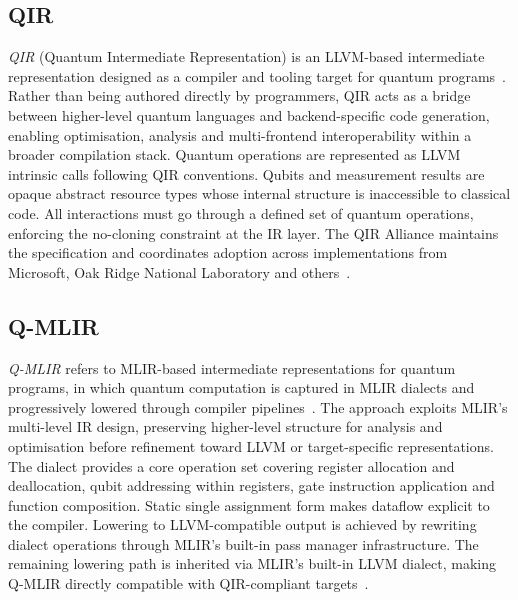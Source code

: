 \subsection{QIR}\label{subsec:pub_qpl_review:language_descriptions:qir}
\textit{QIR} (Quantum Intermediate Representation) is an LLVM-based intermediate representation designed as a compiler and tooling target for quantum programs~\cite{qir_alliance_qir_spec_repo,microsoft_qir_overview}.
Rather than being authored directly by programmers, QIR acts as a bridge between higher-level quantum languages and backend-specific code generation, enabling optimisation, analysis and multi-frontend interoperability within a broader compilation stack.
Quantum operations are represented as LLVM intrinsic calls following QIR conventions.
Qubits and measurement results are opaque abstract resource types whose internal structure is inaccessible to classical code.
All interactions must go through a defined set of quantum operations, enforcing the no-cloning constraint at the IR layer.
The QIR Alliance maintains the specification and coordinates adoption across implementations from Microsoft, Oak Ridge National Laboratory and others~\cite{qir_alliance_qir_spec_repo}.

\subsection{Q-MLIR}\label{subsec:pub_qpl_review:language_descriptions:qmlir}
\textit{Q-MLIR} refers to MLIR-based intermediate representations for quantum programs, in which quantum computation is captured in MLIR dialects and progressively lowered through compiler pipelines~\cite{McCaskey2021MLIRDialectQASM}.
The approach exploits MLIR's multi-level IR design, preserving higher-level structure for analysis and optimisation before refinement toward LLVM or target-specific representations.
The dialect provides a core operation set covering register allocation and deallocation, qubit addressing within registers, gate instruction application and function composition.
Static single assignment form makes dataflow explicit to the compiler.
Lowering to LLVM-compatible output is achieved by rewriting dialect operations through MLIR's built-in pass manager infrastructure.
The remaining lowering path is inherited via MLIR's built-in LLVM dialect, making Q-MLIR directly compatible with QIR-compliant targets~\cite{McCaskey2021MLIRDialectQASM}.

